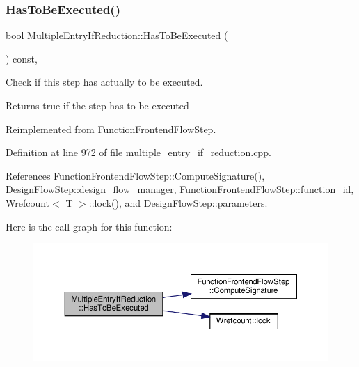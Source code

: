 \subsubsection{\texorpdfstring{Has\+To\+Be\+Executed()}{HasToBeExecuted()}}
{\footnotesize\ttfamily bool Multiple\+Entry\+If\+Reduction\+::\+Has\+To\+Be\+Executed (\begin{DoxyParamCaption}{ }\end{DoxyParamCaption}) const\hspace{0.3cm}{\ttfamily [override]}, {\ttfamily [virtual]}}



Check if this step has actually to be executed. 

\begin{DoxyReturn}{Returns}
true if the step has to be executed 
\end{DoxyReturn}


Reimplemented from \hyperlink{classFunctionFrontendFlowStep_a12e786363530aa9533e4bd9380130d75}{Function\+Frontend\+Flow\+Step}.



Definition at line 972 of file multiple\+\_\+entry\+\_\+if\+\_\+reduction.\+cpp.



References Function\+Frontend\+Flow\+Step\+::\+Compute\+Signature(), Design\+Flow\+Step\+::design\+\_\+flow\+\_\+manager, Function\+Frontend\+Flow\+Step\+::function\+\_\+id, Wrefcount$<$ T $>$\+::lock(), and Design\+Flow\+Step\+::parameters.

Here is the call graph for this function\+:
\nopagebreak
\begin{figure}[H]
\begin{center}
\leavevmode
\includegraphics[width=350pt]{d3/d5a/classMultipleEntryIfReduction_a0aed1493c46ae158341d4dffef7aae62_cgraph}
\end{center}
\end{figure}
\mbox{\label{classMultipleEntryIfReduction_adbaeee425a62fdee6e6723ce59a4cf2a}} 
